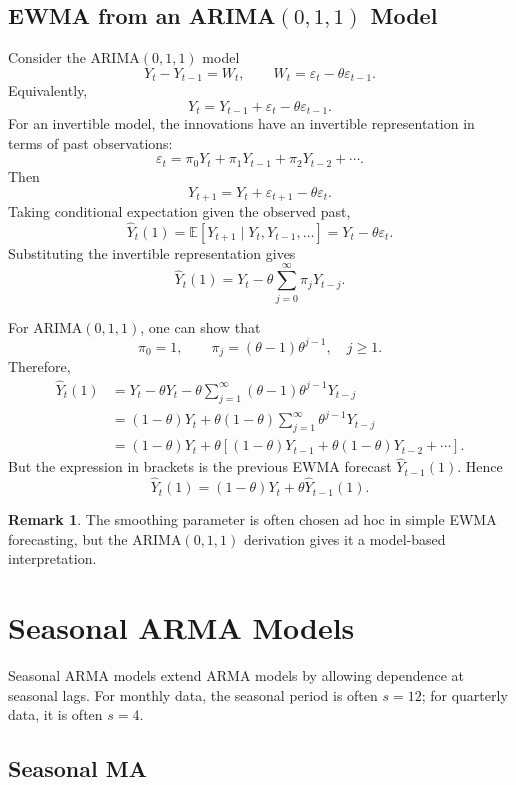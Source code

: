 \documentclass[12pt,oneside]{book}
\numberwithin{equation}{section}
\theoremstyle{definition}
\newtheorem{remark}{Remark}[section]
\theoremstyle{plain}
\theoremstyle{remark}
\newcommand{\E}{\mathbb{E}}
\begin{document}
\subsection{EWMA from an ARIMA$(0,1,1)$ Model}

Consider the ARIMA$(0,1,1)$ model
\[
Y_t-Y_{t-1}=W_t,
\qquad
W_t=\varepsilon_t-\theta\varepsilon_{t-1}.
\]
Equivalently,
\[
Y_t=Y_{t-1}+\varepsilon_t-\theta\varepsilon_{t-1}.
\]
For an invertible model, the innovations have an invertible representation in terms of past observations:
\[
\varepsilon_t
=
\pi_0Y_t+\pi_1Y_{t-1}+\pi_2Y_{t-2}+\cdots.
\]
Then
\[
Y_{t+1}
=
Y_t+\varepsilon_{t+1}-\theta\varepsilon_t.
\]
Taking conditional expectation given the observed past,
\[
\widehat{Y}_t(1)
=
\E[Y_{t+1}\mid Y_t,Y_{t-1},\ldots]
=
Y_t-\theta\varepsilon_t.
\]
Substituting the invertible representation gives
\[
\widehat{Y}_t(1)
=
Y_t-\theta\sum_{j=0}^{\infty}\pi_jY_{t-j}.
\]

For ARIMA$(0,1,1)$, one can show that
\[
\pi_0=1,
\qquad
\pi_j=(\theta-1)\theta^{j-1},
\quad j\geq 1.
\]
Therefore,
\begin{align*}
\widehat{Y}_t(1)
&=
Y_t-\theta Y_t-\theta\sum_{j=1}^{\infty}(\theta-1)\theta^{j-1}Y_{t-j} \\
&=
(1-\theta)Y_t+\theta(1-\theta)\sum_{j=1}^{\infty}\theta^{j-1}Y_{t-j} \\
&=
(1-\theta)Y_t+\theta\left[(1-\theta)Y_{t-1}+\theta(1-\theta)Y_{t-2}+\cdots\right].
\end{align*}
But the expression in brackets is the previous EWMA forecast $\widehat{Y}_{t-1}(1)$. Hence
\[
\widehat{Y}_t(1)
=
(1-\theta)Y_t+\theta\widehat{Y}_{t-1}(1).
\]

\begin{remark}
The smoothing parameter is often chosen ad hoc in simple EWMA forecasting, but the ARIMA$(0,1,1)$ derivation gives it a model-based interpretation.
\end{remark}

\section{Seasonal ARMA Models}

Seasonal ARMA models extend ARMA models by allowing dependence at seasonal lags. For monthly data, the seasonal period is often $s=12$; for quarterly data, it is often $s=4$.

\subsection{Seasonal MA}
\end{document}
